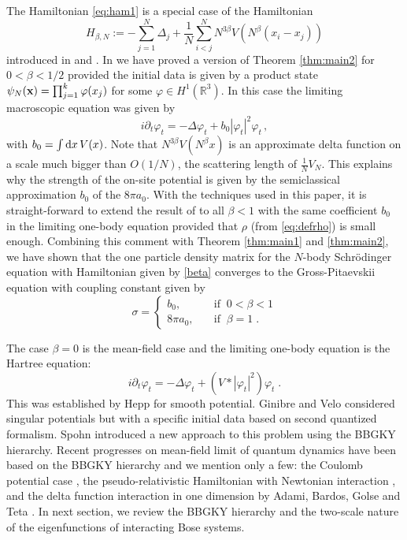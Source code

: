 \documentclass[11pt]{article}
\newcommand{\rd}{{\rm d}}
\newcommand{\be}{\begin{equation}}
\newcommand{\ee}{\end{equation}}
\newcommand{\bx}{{\bf x}}
\newcommand{\ph}{\varphi}
\newcommand{\bR}{{\mathbb R}}
\begin{document}
The Hamiltonian \eqref{eq:ham1} is a special case of the Hamiltonian
\begin{equation}\label{beta}
H_{\beta, N} := -\sum_{j=1}^N \Delta_j + \frac{1}{N} \sum_{i<j}^N
N^{3\beta} V (N^{\beta} (x_i -x_j))
\end{equation}
introduced in \cite{EESY} and \cite{ESY2}. In \cite{ESY2} we have
proved a version of Theorem \ref{thm:main2} for  $0< \beta <1/2$
provided the initial data is given by a product state $\psi_{N}
(\bx) = \prod_{j=1}^k \ph (x_j)$ for some $\ph \in H^1 (\bR^3)$. In
this case the limiting macroscopic equation was given by
\[ i \partial_t \ph_t = -\Delta \ph_t + b_0 |\ph_t|^2 \ph_t \,,\]
with $b_0 = \int \rd x \, V(x)$. Note that $N^{3\beta} V(N^\beta x)$
is an approximate delta function on a scale much bigger than
$O(1/N)$, the scattering length of $\frac{1}{N} V_{N}$. This
explains why the strength of the on-site potential is given by the
semiclassical approximation $b_0$ of the $8\pi a_0$. With the
techniques used in this paper, it is straight-forward to extend the
result of \cite{ESY2}  to all $\beta <1$ with the same coefficient
$b_0$ in the limiting one-body equation provided that $\rho$ (from
\eqref{eq:defrho}) is small enough. Combining this comment with
Theorem \ref{thm:main1} and \ref{thm:main2}, we have shown that the
one particle density matrix for the $N$-body Schr\"odinger equation
with Hamiltonian given by \eqref{beta} converges to the
Gross-Pitaevskii equation with coupling constant given by
\begin{equation}
\sigma = \begin{cases} b_0,  &  \quad \text{if} \;\;  0< \beta < 1\\
8 \pi a_0,  & \quad \text{if} \;\; \beta = 1\;.
\end{cases}
\end{equation}





The case $\beta=0$ is the mean-field case and  the limiting one-body
equation is the Hartree equation: \be i\partial_t\varphi_t = -\Delta
\varphi_t + (V\ast |\varphi_t|^2)\varphi_t\; . \label{eq:hartree}
\ee This was established by Hepp \cite{H} for smooth potential.
Ginibre and Velo \cite{GV} considered singular potentials but with a
specific initial data based on second quantized formalism. Spohn
\cite{Sp} introduced a new approach to this problem using the BBGKY
hierarchy. Recent progresses on mean-field limit of quantum dynamics
have been based on the BBGKY hierarchy and we mention only a few:
the Coulomb potential case \cite{BGM, EY}, the
 pseudo-relativistic Hamiltonian with Newtonian
interaction  \cite{ES},  and the delta function interaction in one
dimension by Adami, Bardos, Golse and Teta   \cite{ABGT} \cite{AGT}.
In next section, we review the BBGKY hierarchy and the two-scale
nature of the eigenfunctions of interacting Bose systems.
\end{document}
